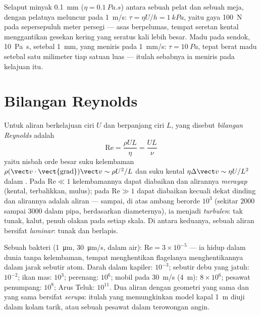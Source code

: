 \begin{example}\label{ex:b2:viscous-flows:table}
Selaput minyak \qty{0.1}{mm} ($\eta = \qty{0.1}{Pa.s}$) antara sebuah pelat dan
sebuah meja, dengan pelatnya meluncur pada \qty{1}{m/s}: $\tau = \eta U/h = \qty{1}{kPa}$, yaitu
gaya \qty{100}{N} pada sepersepuluh meter persegi --- asas 
berpelumas, tempat seretan kental menggantikan gesekan kering yang
seratus kali lebih besar. Madu pada sendok, \qty{10}{Pa.s}, setebal \qty{1}{mm},
yang meniris pada \qty{1}{mm/s}: $\tau = \qty{10}{Pa}$, tepat berat
madu setebal satu milimeter tiap satuan luas --- itulah sebabnya ia meniris pada kelajuan itu.
\end{example}

\section{Bilangan Reynolds}

\begin{definition}\label{def:b2:viscous-flows:reynolds}
Untuk aliran berkelajuan ciri $U$ dan berpanjang ciri $L$, yang disebut
\emph{bilangan Reynolds} adalah
\[
\mathrm{Re} = \frac{\rho UL}{\eta} = \frac{UL}{\nu}
\]
yaitu nisbah orde besar suku kelembaman
$\rho(\vect v\cdot\operatorname{\vect{grad}})\vect v \sim \rho U^2/L$ dan suku
kental $\eta\Delta\vect v \sim \eta U/L^2$ dalam . Pada $\mathrm{Re} \ll 1$ kelembamannya dapat diabaikan dan alirannya
\emph{merayap} (kental, terbalikkan, mulus); pada $\mathrm{Re} \gg 1$
 dapat diabaikan kecuali dekat dinding dan alirannya adalah aliran
 --- sampai, di atas ambang berorde $10^3$ (sekitar $2000$
sampai $3000$ dalam pipa, berdasarkan diameternya), ia menjadi \emph{turbulen}:
tak tunak, kalut, penuh olakan pada setiap skala. Di antara keduanya, sebuah
aliran bersifat \emph{laminar}: tunak dan berlapis.
\end{definition}

\begin{example}\label{ex:b2:viscous-flows:revalues}
Sebuah bakteri (\qty{1}{\micro m}, \qty{30}{\micro m/s}, dalam air): $\mathrm{Re} =
3 \times 10^{-5}$ --- ia hidup dalam dunia tanpa kelembaman, tempat menghentikan
flagelanya menghentikannya dalam jarak sebutir atom. Darah dalam kapiler:
$10^{-3}$; sebutir debu yang jatuh: $10^{-2}$; ikan mas: $10^3$; perenang:
$10^6$; mobil pada \qty{30}{m/s} (\qty{4}{m}): $8 \times 10^6$; pesawat penumpang: $10^8$;
Arus Teluk: $10^{11}$. Dua aliran dengan geometri yang sama dan
 yang sama bersifat \emph{serupa}: itulah yang memungkinkan model kapal \qty{1}{m}
diuji dalam kolam tarik, atau sebuah pesawat dalam terowongan angin.
\end{example}

